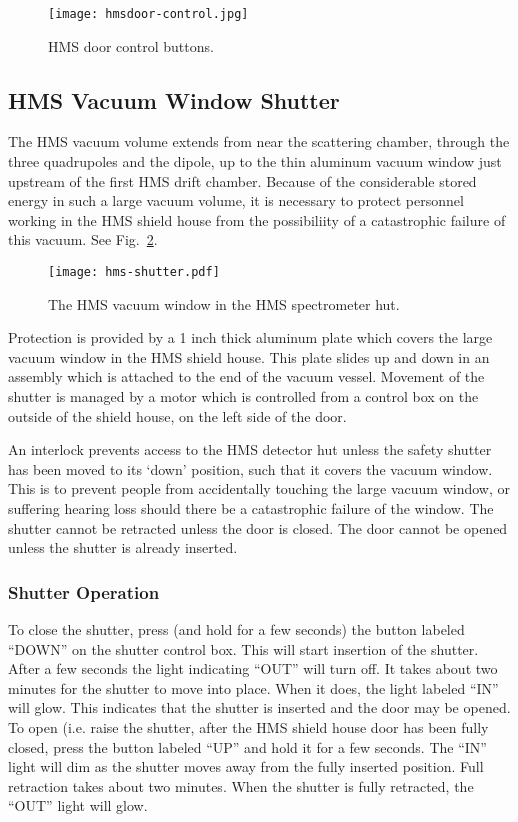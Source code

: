 {\begin{figure}
\begin{center}
\texttt{[image: hmsdoor-control.jpg]}
\caption{\label{fig:hmsdoorcontrol}HMS door control buttons.
}
\end{center}
\end{figure}

\subsection{HMS Vacuum Window Shutter}
The HMS vacuum volume extends from near the scattering chamber,
through the three quadrupoles and the dipole, up to the thin aluminum
vacuum window just upstream of the first HMS drift chamber. Because of
the considerable stored energy in such a large vacuum volume, it is
necessary to protect personnel working in the HMS shield house from
the possibiliity of a catastrophic failure of this vacuum.  See
Fig.~\ref{fig:hmsshutter}.

\begin{figure}
\texttt{[image: hms-shutter.pdf]}
\caption{\label{fig:hmsshutter}The HMS vacuum window in the HMS spectrometer hut.
}
\end{figure}

Protection is provided by a 1 inch thick aluminum plate which covers
the large vacuum window in the HMS shield house. This plate slides up
and down in an assembly which is attached to the end of the vacuum
vessel. Movement of the shutter is managed by a motor which is
controlled from a control box on the outside of the shield house, on
the left side of the door.

An interlock prevents access to the HMS detector hut unless the safety shutter has been moved to its `down' position, such that it covers the vacuum window. This is to prevent people from accidentally touching the large vacuum window, or suffering hearing loss should there be a catastrophic failure of the window. The shutter cannot be retracted unless the door is closed. The door cannot be opened unless the shutter is already inserted.

\subsubsection{Shutter Operation}

To close the shutter, press (and hold for a few seconds) the button
labeled ``DOWN'' on the shutter control box. This will start insertion
of the shutter. After a few seconds the light indicating ``OUT'' will
turn off. It takes about two minutes for the shutter to move into
place. When it does, the light labeled ``IN'' will glow. This
indicates that the shutter is inserted and the door may be opened.  To
open (i.e. raise the shutter, after the HMS shield house door has been
fully closed, press the button labeled ``UP'' and hold it for a few
seconds. The ``IN'' light will dim as the shutter moves away from the
fully inserted position. Full retraction takes about two minutes. When
the shutter is fully retracted, the ``OUT'' light will glow.

}
